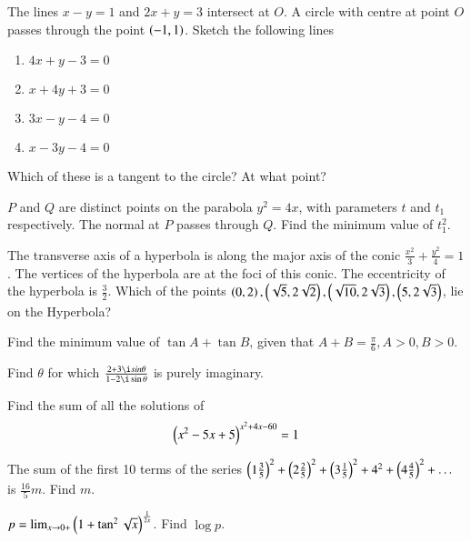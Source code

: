 \documentclass[journal,12pt,onecolumn]{IEEEtran}
\begin{document}
\begin{problem}
The lines $x-y=1$ and $2x+y=3$ intersect at $O$.  A circle with centre at point $O$ passes through the point $\left(-1,1\right)$. Sketch the following lines
\begin{enumerate}
\item $4x +y -3 = 0$
\item $x + 4y+3 = 0$
\item $3x - y  - 4 = 0$
\item $x - 3y - 4 = 0$
\end{enumerate}
Which of these is a tangent to the circle? At what point?
\end{problem}
\begin{problem}
$P$ and $Q$ are distinct points on the parabola $y^2 = 4x$, with parameters $t$ and $t_1$ respectively. The normal at $P$ passes through $Q$.  Find the minimum value of $t_1^2$.
\end{problem}
\begin{problem}
The transverse axis of a hyperbola is along the major axis of the conic $\frac{x^2}{3}+ \frac{y^2}{4} = 1$. The vertices of the hyperbola are at the foci of this conic. The eccentricity of the hyperbola is $\frac{3}{2}$. Which of the points $\left(0,2\right),\left(\sqrt{5},2\sqrt{2}\right),\left(\sqrt{10},2\sqrt{3}\right),\left(5, 2\sqrt{3}\right)$, lie on the Hyperbola?
\end{problem}
\begin{problem}
Find the minimum value of $\tan A + \tan B$, given that $ A+B = \frac{\pi}{6}, A>0,B>0$.
\end{problem}
%
\begin{problem}
Find $\theta$ for which $\frac{2+3\i sin \theta}{1 - 2\i \sin \theta}$ is purely imaginary.
\end{problem}
\begin{problem}
Find the sum of all the solutions of 
\begin{equation*}
\left(x^2-5x+5\right)^{x^2+4x-60}=1
\end{equation*}
\end{problem}
\begin{problem}
The sum of the first 10 terms of the series $\left(1\frac{3}{5}\right)^2+\left(2\frac{2}{5}\right)^2+\left(3\frac{1}{5}\right)^2+4^2+\left(4\frac{4}{5}\right)^2 + \dots $ is $\frac{16}{5}m$.  Find $m$.
\end{problem}
\begin{problem}
$p = \lim_{x \rightarrow 0+}\left(1+\tan^2\sqrt{x}\right)^{\frac{1}{2x}}$. Find  $\log p$.
\end{problem}
\end{document}
